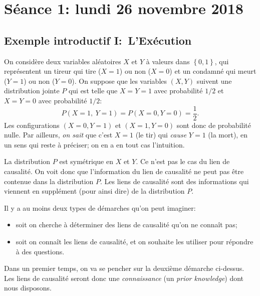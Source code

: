 \chapter{Séance 1: lundi 26 novembre 2018}

\section{Exemple introductif I:\ L'Exécution}
\label{sec:exemple-intr-i}

On considère deux variables aléatoires \(X\) et \(Y\) à valeurs dans
\(\left\{ 0,1 \right\}\), qui représentent un tireur qui tire (\(X=1\)) ou
non (\(X=0\)) et un condamné qui meurt (\(Y=1\)) ou non (\(Y=0\)). On
suppose que les variables \((X,Y)\) suivent une distribution jointe \(P\) qui est
telle que \(X=Y=1\) avec probabilité \(1/2\) et \(X=Y=0\) avec probabilité
\(1/2\): \[ P\left( X=1,\ Y=1 \right)=P(X=0,Y=0)=\frac{1}{2}. \] Les
configurations \((X=0,Y=1)\) et \((X=1,Y=0)\) sont donc de probabilité
nulle.  Par ailleurs, \emph{on sait} que c'est \(X=1\) (le tir) qui \emph{cause}
\(Y=1\) (la mort), en un sens qui reste à préciser; on en a en tout cas
l'intuition.
\begin{center}
\end{center}

\begin{remark}
La distribution $P$ est symétrique en $X$ et $Y$. Ce n'est pas le cas du lien de causalité. 
On voit donc que l'information du lien de causalité ne peut pas être contenue dans la distribution $P$.
Les liens de causalité sont des informations qui viennent en supplément (pour ainsi dire) de la distribution $P$.
\end{remark}

Il y a au moins deux types de démarches qu'on peut imaginer:
\begin{itemize}
\item soit on cherche à déterminer des liens de causalité qu'on ne connaît pas;
\item soit on connaît les liens de causalité, et on souhaite les utiliser
pour répondre à des questions.
\end{itemize}
Dans un premier temps, on va se pencher sur la deuxième démarche
ci-dessus. Les liens de causalité seront donc une \emph{connaissance} (un
\emph{prior knowledge}) dont nous disposons.

